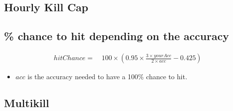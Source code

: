         \subsection{Hourly Kill Cap}
            \todo{}
        \subsection{\% chance to hit depending on the accuracy}
            \begin{align*}
                hitChance = &\ 100 \times \left( 0.95 \times \frac{3 \times yourAcc}{2 \times acc} - 0.425\right) 
            \end{align*}
            \begin{itemize}
                \item $acc$ is the accuracy needed to have a 100\% chance to hit.
            \end{itemize}

        \newpage
        \subsection{Multikill}
            \todo{}

